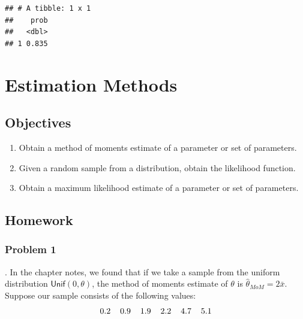 \documentclass[
]{book}
\providecommand{\tightlist}{%
  \setlength{\itemsep}{0pt}\setlength{\parskip}{0pt}}
\begin{document}
\begin{verbatim}
## # A tibble: 1 x 1
##    prob
##   <dbl>
## 1 0.835
\end{verbatim}

\hypertarget{EST}{%
\chapter{Estimation Methods}\label{EST}}

\newcommand{\E}{\mbox{E}}
\newcommand{\Var}{\mbox{Var}}
\newcommand{\Cov}{\mbox{Cov}}
\newcommand{\Prob}{\mbox{P}}
\newcommand{\diff}{\,\mathrm{d}}

\hypertarget{objectives-16}{%
\section{Objectives}\label{objectives-16}}

\begin{enumerate}
\def\labelenumi{\arabic{enumi})}
\tightlist
\item
  Obtain a method of moments estimate of a parameter or set of parameters.\\
\item
  Given a random sample from a distribution, obtain the likelihood function.\\
\item
  Obtain a maximum likelihood estimate of a parameter or set of parameters.
\end{enumerate}

\hypertarget{homework-16}{%
\section{Homework}\label{homework-16}}

\hypertarget{problem-1-16}{%
\subsection{Problem 1}\label{problem-1-16}}

. In the chapter notes, we found that if we take a sample from the uniform distribution \(\textsf{Unif}(0,\theta)\), the method of moments estimate of \(\theta\) is \(\hat{\theta}_{MoM}=2\bar{x}\). Suppose our sample consists of the following values:
\[
0.2 \hspace{0.4cm} 0.9 \hspace{0.4cm} 1.9 \hspace{0.4cm} 2.2 \hspace{0.4cm} 4.7 \hspace{0.4cm} 5.1
\]
\end{document}
